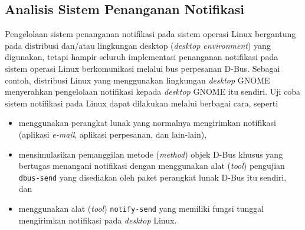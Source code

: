 \subsection{Analisis Sistem Penanganan Notifikasi}

Pengelolaan sistem penanganan notifikasi pada sistem operasi Linux bergantung pada distribusi dan/atau lingkungan desktop (\textit{desktop environment}) yang digunakan, tetapi hampir seluruh implementasi penanganan notifikasi pada sistem operasi Linux berkomunikasi melalui bus perpesanan D-Bus. Sebagai contoh, distribusi Linux yang menggunakan lingkungan \textit{desktop} GNOME menyerahkan pengelolaan notifikasi kepada \textit{desktop} GNOME itu sendiri. Uji coba sistem notifikasi pada Linux dapat dilakukan melalui berbagai cara, seperti
\begin{itemize}
    \item menggunakan perangkat lunak yang normalnya mengirimkan notifikasi (aplikasi \textit{e-mail}, aplikasi perpesanan, dan lain-lain),
    \item mensimulasikan pemanggilan metode (\textit{method}) objek D-Bus khusus yang bertugas menangani notifikasi dengan menggunakan alat (\textit{tool}) pengujian \verb|dbus-send| yang disediakan oleh paket perangkat lunak D-Bus itu sendiri, dan
    \item menggunakan alat (\textit{tool}) \verb|notify-send| yang memiliki fungsi tunggal mengirimkan notifikasi pada \textit{desktop} Linux.
\end{itemize}

